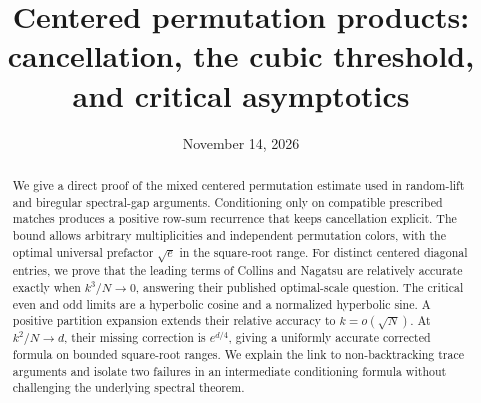 \documentclass[11pt]{article}
\title{Centered permutation products:\\ cancellation, the cubic threshold,\\ and critical asymptotics}
\author{}
\date{November 14, 2026}
\theoremstyle{definition}
\theoremstyle{remark}
\newcommand{\1}{\mathbf 1}
\begin{document}
\maketitle
\begin{abstract}
We give a direct proof of the mixed centered permutation estimate used in random-lift and biregular spectral-gap arguments. Conditioning only on compatible prescribed matches produces a positive row-sum recurrence that keeps cancellation explicit. The bound allows arbitrary multiplicities and independent permutation colors, with the optimal universal prefactor $\sqrt e$ in the square-root range. For distinct centered diagonal entries, we prove that the leading terms of Collins and Nagatsu are relatively accurate exactly when $k^3/N\to0$, answering their published optimal-scale question. The critical even and odd limits are a hyperbolic cosine and a normalized hyperbolic sine. A positive partition expansion extends their relative accuracy to $k=o(\sqrt N)$. At $k^2/N\to d$, their missing correction is $e^{d/4}$, giving a uniformly accurate corrected formula on bounded square-root ranges. We explain the link to non-backtracking trace arguments and isolate two failures in an intermediate conditioning formula without challenging the underlying spectral theorem.
\end{abstract}
\tableofcontents
\clearpage








\end{document}
